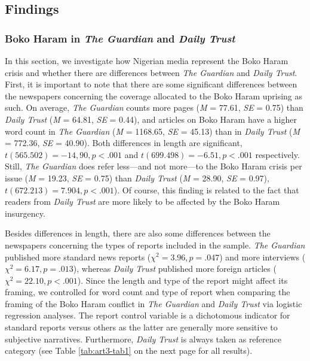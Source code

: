 \newpage
\subsection{Findings}
\label{sec:442}

\subsubsection{Boko Haram in \textit{The Guardian} and \textit{Daily Trust}}
In this section, we investigate how Nigerian media represent the Boko Haram crisis and whether there are differences between \textit{The Guardian} and \textit{Daily Trust}. First, it is important to note that there are some significant differences between the newspapers concerning the coverage allocated to the Boko Haram uprising as such. On average, \textit{The Guardian }counts more pages (\textit{M} = 77.61, \textit{SE} = 0.75) than \textit{Daily Trust} (\textit{M} = 64.81, \textit{SE }= 0.44), and articles on Boko Haram have a higher word count in \textit{The Guardian} (\textit{M} = 1168.65, \textit{SE} = 45.13) than in \textit{Daily Trust} (\textit{M} = 772.36, \textit{SE} = 40.90). Both differences in length are significant, $t(565.502) = -14,90, p < .001$ and $t(699.498) = -6.51, p < .001$ respectively. Still, \textit{The Guardian} does refer less---and not more---to the Boko Haram crisis per issue (\textit{M} = 19.23, \textit{SE }= 0.75) than \textit{Daily Trust} (\textit{M} = 28.90, \textit{SE }= 0.97), $t(672.213) = 7.904, p < .001$). Of course, this finding is related to the fact that readers from \textit{Daily Trust} are more likely to be affected by the Boko Haram insurgency.


Besides differences in length, there are also some differences between the newspapers concerning the types of reports included in the sample. \textit{The Guardian }published more standard news reports ($\chi^2 = 3.96, p = .047$) and more interviews ($\chi^2= 6.17, p =.013$), whereas \textit{Daily Trust} published more foreign articles ($\chi^2 = 22.10, p < .001$). Since the length and type of the report might affect its framing, we controlled for word count and type of report when comparing the framing of the Boko Haram conflict in \textit{The Guardian }and \textit{Daily Trust} via logistic regression analyses. The report control variable is a dichotomous indicator for standard reports versus others as the latter are generally more sensitive to subjective narratives. Furthermore, \textit{Daily Trust} is always taken as reference category (see Table \ref{tab:art3-tab1} on the next page for all results).


